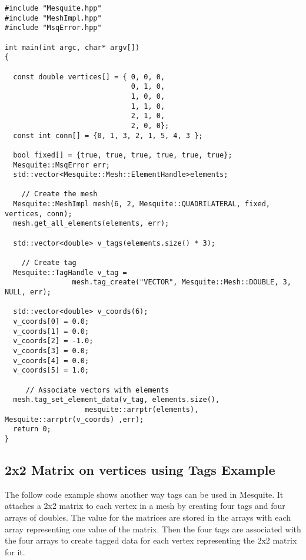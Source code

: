 \begin{lstlisting}
#include "Mesquite.hpp"
#include "MeshImpl.hpp"
#include "MsqError.hpp"

int main(int argc, char* argv[])
{

  const double vertices[] = { 0, 0, 0,
                              0, 1, 0,
                              1, 0, 0,
                              1, 1, 0,
                              2, 1, 0,
                              2, 0, 0};
  const int conn[] = {0, 1, 3, 2, 1, 5, 4, 3 };

  bool fixed[] = {true, true, true, true, true, true};
  Mesquite::MsqError err;
  std::vector<Mesquite::Mesh::ElementHandle>elements;

    // Create the mesh
  Mesquite::MeshImpl mesh(6, 2, Mesquite::QUADRILATERAL, fixed, vertices, conn);
  mesh.get_all_elements(elements, err);

  std::vector<double> v_tags(elements.size() * 3);

    // Create tag
  Mesquite::TagHandle v_tag = 
                mesh.tag_create("VECTOR", Mesquite::Mesh::DOUBLE, 3, NULL, err);

  std::vector<double> v_coords(6);
  v_coords[0] = 0.0;
  v_coords[1] = 0.0;
  v_coords[2] = -1.0;
  v_coords[3] = 0.0;
  v_coords[4] = 0.0;
  v_coords[5] = 1.0;

     // Associate vectors with elements
  mesh.tag_set_element_data(v_tag, elements.size(), 
                   mesquite::arrptr(elements), Mesquite::arrptr(v_coords) ,err);
  return 0;
}
\end{lstlisting}

\subsection{2x2 Matrix on vertices using Tags Example}

The follow code example shows another way tags can be used in Mesquite.  It attaches a 2x2 matrix to each vertex in a mesh by creating four tags and four arrays of doubles. The value for the matrices are stored in the arrays with each array representing one value of the matrix. Then the four tags are associated with the four arrays to create tagged data for each vertex representing the 2x2 matrix for it.


